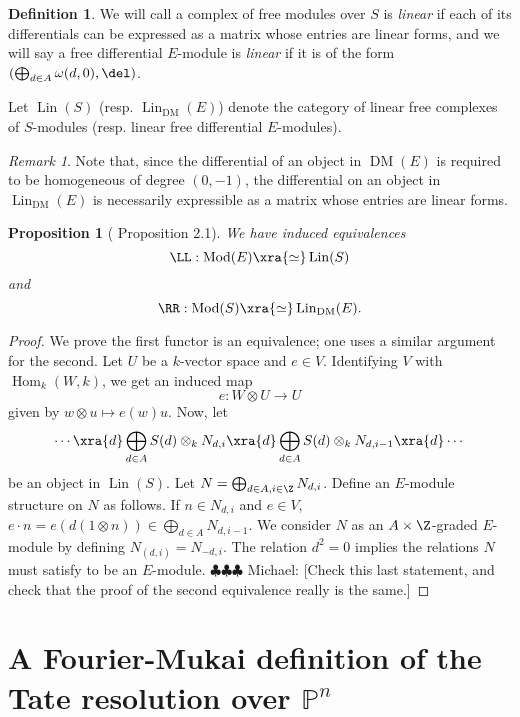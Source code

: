 \documentclass[12pt]{amsart}
\newtheorem{prop}[lemma]{Proposition}
\theoremstyle{definition}
\newtheorem{defn}[lemma]{Definition}
\theoremstyle{remark}
\newtheorem{rem}[lemma]{Remark}
\newcommand{\PP}{\mathbb P}
\newcommand{\Hom}{\operatorname{Hom}} %
\newcommand{\michael}[1]{{\color{red} \sf $\clubsuit\clubsuit\clubsuit$ Michael: [#1]}}
\def\on{\operatorname}
\def\om{\omega}
\def\DM{\operatorname{DM}}
\def\Mod{\operatorname{Mod}}
\def\om{\omega}
\begin{document}
\begin{defn}
We will call a complex of free modules over $S$ is \emph{linear} if each of its differentials can be expressed as a matrix whose entries are linear forms, and we will say a free differential $E$-module is \emph{linear} if it is of the form $(\bigoplus_{d \in A} \om(d, 0), \del)$.
\end{defn}

Let $\on{Lin}(S)$ (resp. $\on{Lin}_{\DM}(E)$) denote the category of linear free complexes of $S$-modules (resp. linear free differential $E$-modules).

\begin{rem}
Note that, since the differential of an object in $\DM(E)$ is required to be homogeneous of degree $(0, -1)$, the differential on an object in $\on{Lin}_{\DM}(E)$ is necessarily expressible as a matrix whose entries are linear forms. 
\end{rem}


\begin{prop}[\cite{EFS} Proposition 2.1] We have induced equivalences
$$
\LL :  \Mod(E) \xra{\simeq} \on{Lin}(S)
$$
and
$$
\RR :\Mod(S) \xra{\simeq} \on{Lin}_{\DM}(E).
$$
\end{prop}


\begin{proof}
We prove the first functor is an equivalence; one uses a similar argument for the second. Let $U$ be a $k$-vector space and $e \in V$. Identifying $V$ with $\Hom_k(W, k)$, we get an induced map
$$
e : W \otimes U \to U
$$
given by $w \otimes u \mapsto e(w)u$. Now, let
$$
\cdots \xra{d} \bigoplus_{d \in A}S(d)  \otimes_k N_{d,i}  \xra{d} \bigoplus_{d \in A} S(d) \otimes_k N_{d, i-1} \xra{d} \cdots
$$
be an object in $\on{Lin}(S)$. Let $N = \bigoplus_{d \in A, i \in \Z} N_{d, i}$. Define an $E$-module structure on $N$ as follows. If $n \in N_{d,i}$ and $e \in V$, $e \cdot n = e(d(1 \otimes n)) \in \bigoplus_{d \in A} N_{d, i-1}$. We consider $N$ as an $A \times \Z$-graded $E$-module by defining $N_{(d, i)} = N_{-d, i}$. The relation $d^2 = 0$ implies the relations $N$ must satisfy to be an $E$-module. \michael{Check this last statement, and check that the proof of the second equivalence really is the same.}
\end{proof}


\section{A Fourier-Mukai definition of the Tate resolution over $\PP^n$}
\end{document}
